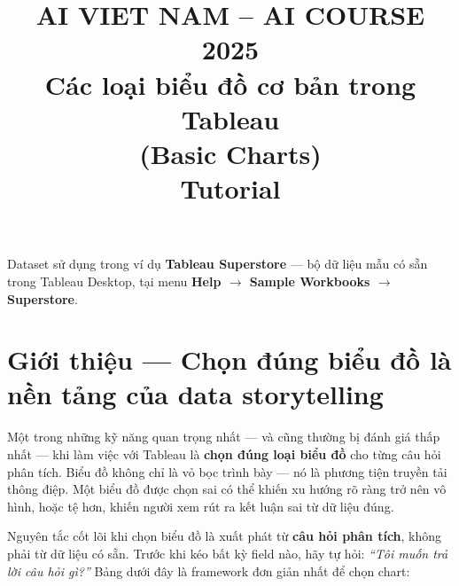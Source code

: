 \documentclass[12pt]{article}
\title{
  \begin{center}
    \Large{AI VIET NAM -- AI COURSE 2025}\\[1ex]
    \Huge\textbf{Các loại biểu đồ cơ bản trong Tableau}\\[0.5ex]
    \large (Basic Charts)\\[1ex]
    \large Tutorial
  \end{center}
}
\author{}
\date{}
\begin{document}
\maketitle

\begin{conceptbox}{Dataset sử dụng trong ví dụ}
\textbf{Tableau Superstore} --- bộ dữ liệu mẫu có sẵn trong Tableau Desktop, tại menu \textbf{Help $\rightarrow$ Sample Workbooks $\rightarrow$ Superstore}.
\end{conceptbox}

\tableofcontents
\newpage

\section{Giới thiệu --- Chọn đúng biểu đồ là nền tảng của data storytelling}

\noindent Một trong những kỹ năng quan trọng nhất --- và cũng thường bị đánh giá thấp nhất --- khi làm việc với Tableau là \textbf{chọn đúng loại biểu đồ} cho từng câu hỏi phân tích. Biểu đồ không chỉ là vỏ bọc trình bày --- nó là phương tiện truyền tải thông điệp. Một biểu đồ được chọn sai có thể khiến xu hướng rõ ràng trở nên vô hình, hoặc tệ hơn, khiến người xem rút ra kết luận sai từ dữ liệu đúng.

\noindent Nguyên tắc cốt lõi khi chọn biểu đồ là xuất phát từ \textbf{câu hỏi phân tích}, không phải từ dữ liệu có sẵn. Trước khi kéo bất kỳ field nào, hãy tự hỏi: \textit{``Tôi muốn trả lời câu hỏi gì?''} Bảng dưới đây là framework đơn giản nhất để chọn chart:
\end{document}
